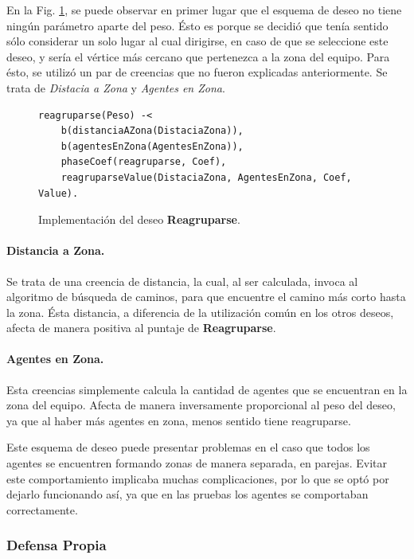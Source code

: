 \documentclass[oneside]{book}
\theoremstyle{definition}
\begin{document}
En la Fig. \ref{fig:deseoReagruparse}, se puede observar en primer lugar que el esquema 
de deseo no tiene ningún parámetro aparte del peso. Ésto es porque se decidió que tenía 
sentido sólo considerar un solo lugar al cual dirigirse, en caso de que se seleccione 
este deseo, y sería el vértice más cercano que pertenezca a la zona del equipo. Para 
ésto, se utilizó un par de creencias que no fueron explicadas anteriormente. Se trata de 
\textit{Distacia a Zona} y \textit{Agentes en Zona}.


\begin{figure}
\begin{verbatim}
reagruparse(Peso) -< 
    b(distanciaAZona(DistaciaZona)),
	b(agentesEnZona(AgentesEnZona)),
    phaseCoef(reagruparse, Coef),
    reagruparseValue(DistaciaZona, AgentesEnZona, Coef, Value).
\end{verbatim}
\caption{Implementación del deseo \textbf{Reagruparse}.}
\label{fig:deseoReagruparse}
\end{figure}


\paragraph{Distancia a Zona.}

Se trata de una creencia de distancia, la cual, al ser calculada, invoca al algoritmo
de búsqueda de caminos, para que encuentre el camino más corto hasta la zona. Ésta 
distancia, a diferencia de la utilización común en los otros deseos, afecta de manera 
positiva al puntaje de \textbf{Reagruparse}.

\paragraph{Agentes en Zona.}

Esta creencias simplemente calcula la cantidad de agentes que se encuentran en la zona
del equipo. Afecta de manera inversamente proporcional al peso del deseo, ya que al 
haber más agentes en zona, menos sentido tiene reagruparse.

\vspace{\baselineskip} 
Este esquema de deseo puede presentar problemas en el caso que todos los agentes se 
encuentren formando zonas de manera separada, en parejas. Evitar este comportamiento
implicaba muchas complicaciones, por lo que se optó por dejarlo funcionando así, ya
que en las pruebas los agentes se comportaban correctamente.


\subsubsection{Defensa Propia}
\end{document}
